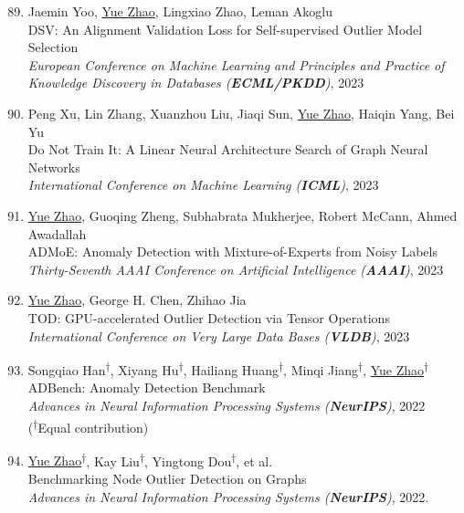 \documentclass[margin,line,pifont,palatino,courier]{res}
\newcommand{\equalcontrib}{\textsuperscript{$\dagger$}}
\newenvironment{benumerate}[1]{
    \let\oldItem\item
    \def\item{\addtocounter{enumi}{-2}\oldItem}
    \begin{enumerate}[leftmargin=0.25in,label=\textcolor{uscred}{\arabic*.}]
    \setcounter{enumi}{#1}
    \addtocounter{enumi}{1}
}{
    \end{enumerate}
}
\begin{document}
\begin{resume}
\begin{benumerate}{88}
    \item Jaemin Yoo, \underline{Yue Zhao}, Lingxiao Zhao, Leman Akoglu\\
    DSV: An Alignment Validation Loss for Self-supervised Outlier Model Selection\\ 
    \textit{European Conference on Machine Learning and Principles and Practice of Knowledge Discovery in Databases (\textbf{ECML/PKDD})}, 2023

    \item Peng Xu, Lin Zhang, Xuanzhou Liu, Jiaqi Sun, \underline{Yue Zhao}, Haiqin Yang, Bei Yu\\
    Do Not Train It: A Linear Neural Architecture Search of Graph Neural Networks\\ 
    \textit{International Conference on Machine Learning (\textbf{ICML})}, 2023
    
    \item \underline{Yue Zhao}, Guoqing Zheng, Subhabrata Mukherjee, Robert McCann, Ahmed Awadallah\\
    ADMoE: Anomaly Detection with Mixture-of-Experts from Noisy Labels\\ 
    \textit{Thirty-Seventh AAAI Conference on Artificial Intelligence (\textbf{AAAI})}, 2023

    \item \underline{Yue Zhao}, George H. Chen, Zhihao Jia\\
    TOD: GPU-accelerated Outlier Detection via Tensor Operations\\ 
    {\textit{International Conference on Very Large Data Bases (\textbf{VLDB})}, 2023}

    \item Songqiao Han\equalcontrib, Xiyang Hu\equalcontrib, Hailiang Huang\equalcontrib, Minqi Jiang\equalcontrib, \underline{Yue Zhao\equalcontrib}\\
    ADBench: Anomaly Detection Benchmark\\ 
    {\textit{Advances in Neural Information Processing Systems (\textbf{NeurIPS})}, 2022}\\
    (\equalcontrib Equal contribution)

    \item \underline{Yue Zhao\equalcontrib}, Kay Liu\equalcontrib, Yingtong Dou\equalcontrib, et al.\\
    Benchmarking Node Outlier Detection on Graphs\\ 
    \textit{Advances in Neural Information Processing Systems (\textbf{NeurIPS})}, 2022.



\end{benumerate}
\end{resume}
\end{document}
